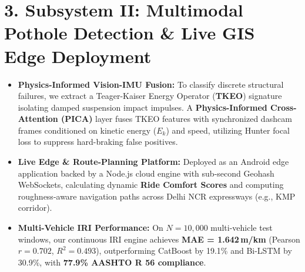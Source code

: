 \documentclass[9pt,a4paper]{extarticle}
\begin{document}
\section{3. Subsystem II: Multimodal Pothole Detection \& Live GIS Edge Deployment}
\noindent
\begin{minipage}{0.54\textwidth}
    \begin{itemize}
        \item \textbf{Physics-Informed Vision-IMU Fusion:} To classify discrete structural failures, we extract a Teager-Kaiser Energy Operator (\textbf{TKEO}) signature isolating damped suspension impact impulses. A \textbf{Physics-Informed Cross-Attention (PICA)} layer fuses TKEO features with synchronized dashcam frames conditioned on kinetic energy ($E_k$) and speed, utilizing Hunter focal loss to suppress hard-braking false positives.
        \item \textbf{Live Edge \& Route-Planning Platform:} Deployed as an Android edge application backed by a Node.js cloud engine with sub-second Geohash WebSockets, calculating dynamic \textbf{Ride Comfort Scores} and computing roughness-aware navigation paths across Delhi NCR expressways (e.g., KMP corridor).
        \item \textbf{Multi-Vehicle IRI Performance:} On $N=10,000$ multi-vehicle test windows, our continuous IRI engine achieves \textbf{MAE = 1.642\,m/km} (Pearson $r=0.702$, $R^2=0.493$), outperforming CatBoost by 19.1\% and Bi-LSTM by 30.9\%, with \textbf{77.9\% AASHTO R 56 compliance}.
    \end{itemize}
\end{minipage}%
\hfill
\begin{minipage}{0.43\textwidth}
    \centering
    \small
    \vspace{-4pt}
\end{minipage}
\end{document}

